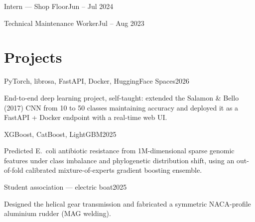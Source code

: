 \documentclass[letterpaper,10pt]{article}
\begin{document}
  {Intern --- Shop Floor}{Jun -- Jul 2024}
\vspace{3pt}

  {Technical Maintenance Worker}{Jul -- Aug 2023}
\vspace{3pt}
\section{Projects}

  {PyTorch, librosa, FastAPI, Docker, HuggingFace Spaces}{2026}
\begin{bullets}
\item End-to-end deep learning project, self-taught: extended the Salamon \& Bello (2017) CNN from 10 to 50 classes maintaining accuracy and deployed it as a FastAPI + Docker endpoint with a real-time web UI.
\end{bullets}
\vspace{3pt}

  {XGBoost, CatBoost, LightGBM}{2025}
\begin{bullets}
  \item Predicted E.~coli antibiotic resistance from 1M-dimensional sparse genomic features under class imbalance and phylogenetic distribution shift, using an out-of-fold calibrated mixture-of-experts gradient boosting ensemble.
\end{bullets}
\vspace{3pt}

  {Student association --- electric boat}{2025}
\begin{bullets}
  \item Designed the helical gear transmission and fabricated a symmetric NACA-profile aluminium rudder (MAG welding).
\end{bullets}
\vspace{3pt}
\end{document}
